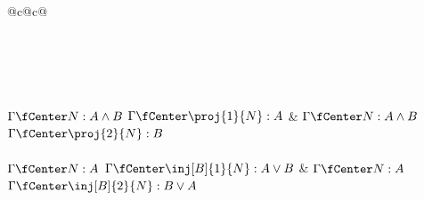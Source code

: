 \begin{table}
\begin{tabular}{@{}c@{}c@{}}
\\
\\[3ex]
\\[3ex]
\\[4ex]
\\[4ex]
\\[4ex]
\Axiom$\Gamma \fCenter N: A \land B$
\RightLabel{\Elim{\land}[1]}
\UnaryInf$\Gamma \fCenter \proj{1}{N} : A$
\DisplayProof
&
\Axiom$\Gamma \fCenter N:A \land B$
\RightLabel{\Elim{\land}[2]}
\UnaryInf$\Gamma \fCenter \proj{2}{N} : B$
\DisplayProof\\[3ex]
\\[4ex]
\Axiom$\Gamma \fCenter N: A$
\RightLabel{\Intro{\lor}[1]}
\UnaryInf$\Gamma \fCenter \inj[B]{1}{N} : A \lor B$
\DisplayProof
&
\Axiom$ \Gamma \fCenter N : A$
\RightLabel{\Intro{\lor}[2]}
\UnaryInf$\Gamma \fCenter \inj[B]{2}{N} : B \lor A$
\DisplayProof\\[3ex]
\\[4ex]
\end{tabular}
\caption{प्रकार-निर्देशन पद्धती म्हणून वापरल्या जाणाऱ्या
 या विधानीय पद-चिन्हांकित अंतःप्रज्ञावादी
नैसर्गिक निगमन पद्धतीचे नियम.}
\label{int:pty:typ:tab:tN3ip}
\end{table}




